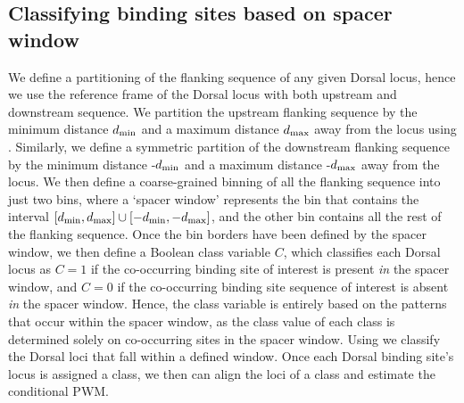 \subsection{Classifying binding sites based on spacer window}

We define a partitioning of the flanking sequence of any given Dorsal locus, hence we use the reference frame of the Dorsal locus with both upstream and downstream sequence.  We partition the upstream flanking sequence by the minimum distance $d_{\rm min}$ and a maximum distance $d_{\rm max}$ away from the locus using .  Similarly, we define a symmetric partition of the downstream flanking sequence by the minimum distance -$d_{\rm min}$ and a maximum distance -$d_{\rm max}$ away from the locus.  We then define a coarse-grained binning of all the flanking sequence into just two bins, where a `spacer window' represents the bin that contains the interval $[d_{\rm min}, d_{\rm max}] \cup [-d_{\rm min}, -d_{\rm max}]$, and the other bin contains all the rest of the flanking sequence.  Once the bin borders have been defined by the spacer window, we then define a Boolean class variable $C$, which classifies each Dorsal locus as $C=1$ if the co-occurring binding site of interest is present \textit{in} the spacer window, and $C=0$ if the co-occurring binding site sequence of interest is absent \textit{in} the spacer window.  Hence, the class variable is entirely based on the patterns that occur within the spacer window, as the class value of each class is determined solely on co-occurring sites in the spacer window.  Using  we classify the Dorsal loci that fall within a defined window.  Once each Dorsal binding site's locus is assigned a class, we then can align the loci of a class and estimate the conditional PWM. 

